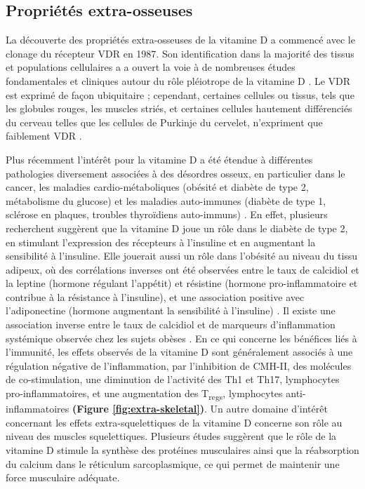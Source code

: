 \documentclass[
  a4paper,
  DIV=11,
  numbers=noendperiod,
  listof=totoc]{scrreprt}
\begin{document}
\hypertarget{propriuxe9tuxe9s-extra-osseuses}{%
\subsection{Propriétés
extra-osseuses}\label{propriuxe9tuxe9s-extra-osseuses}}

La découverte des propriétés extra-osseuses de la vitamine D a commencé
avec le clonage du récepteur \ac{VDR} en 1987. Son identification dans
la majorité des tissus et populations cellulaires a a ouvert la voie à
de nombreuses études fondamentales et cliniques autour du rôle
pléiotrope de la vitamine D \autocite{Rosen.2012}. Le \ac{VDR} est
exprimé de façon ubiquitaire ; cependant, certaines cellules ou tissus,
tels que les globules rouges, les muscles striés, et certaines cellules
hautement différenciés du cerveau telles que les cellules de Purkinje du
cervelet, n'expriment que faiblement \ac{VDR} \autocite{Bouillon.2008}.

Plus récemment l'intérêt pour la vitamine D a été étendue à différentes
pathologies diversement associées à des désordres osseux, en particulier
dans le cancer, les maladies cardio-métaboliques (obésité et diabète de
type 2, métabolisme du glucose) et les maladies auto-immunes (diabète de
type 1, sclérose en plaques, troubles thyroïdiens auto-immuns)
\autocite{Dankers.2017,Caprio.2017}. En effet, plusieurs recherchent
suggèrent que la vitamine D joue un rôle dans le diabète de type 2, en
stimulant l'expression des récepteurs à l'insuline et en augmentant la
sensibilité à l'insuline. Elle jouerait aussi un rôle dans l'obésité au
niveau du tissu adipeux, où des corrélations inverses ont été observées
entre le taux de calcidiol et la leptine (hormone régulant l'appétit) et
résistine (hormone pro-inflammatoire et contribue à la résistance à
l'insuline), et une association positive avec l'adiponectine (hormone
augmentant la sensibilité à l'insuline)
\autocite{Caprio.2017,Bellia.2013}. Il existe une association inverse
entre le taux de calcidiol et de marqueurs d'inflammation systémique
observée chez les sujets obèses \autocite{Bellia.2013}. En ce qui
concerne les bénéfices liés à l'immunité, les effets observés de la
vitamine D sont généralement associés à une régulation négative de
l'inflammation, par l'inhibition de \ac{CMH-II}, des molécules de
co-stimulation, une diminution de l'activité des Th1 et Th17,
lymphocytes pro-inflammatoires, et une augmentation des
T\textsubscript{regs}, lymphocytes anti-inflammatoires \textbf{(Figure
\ref{fig:extra-skeletal})}. Un autre domaine d'intérêt concernant les
effets extra-squelettiques de la vitamine D concerne son rôle au niveau
des muscles squelettiques. Plusieurs études suggèrent que le rôle de la
vitamine D stimule la synthèse des protéines musculaires ainsi que la
réabsorption du calcium dans le réticulum sarcoplasmique, ce qui permet
de maintenir une force musculaire adéquate.
\end{document}
